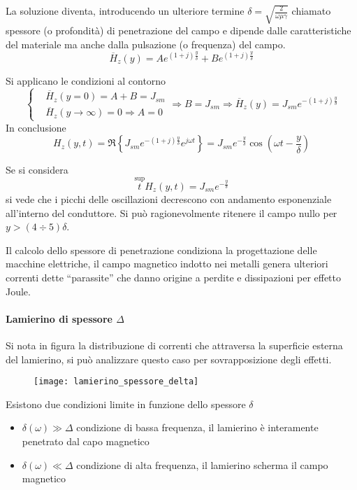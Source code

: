La soluzione diventa, introducendo un ulteriore termine $\delta = \sqrt{\frac{2}{\omega\mu\gamma}}$ chiamato 
spessore (o profondità) di penetrazione del campo e dipende dalle caratteristiche del materiale ma anche
dalla pulsazione (o frequenza) del campo.
$$
\overline{H}_z(y) = Ae^{(1+j)\frac{y}{\delta}} + Be^{(1+j)\frac{y}{\delta}}
$$

Si applicano le condizioni al contorno
$$\left\{
\begin{aligned}
&\overline{H}_z(y=0) = A + B = J_{sm}\\
&\overline{H}_z(y\to\infty)=0 \Rightarrow A = 0
\end{aligned}\right.\Rightarrow B = J_{sm} \Rightarrow \overline{H}_z(y) = J_{sm} e^{-(1+j)\frac{y}{\delta}}
$$
In conclusione
$$
H_z(y,t) = \Re \left\{J_{sm}e^{-(1+j)\frac{y}{\delta}}e^{j\omega t} \right\} = J_{sm}e^{-\frac{y}{\delta}}\cos\left(\omega t - \frac{y}{\delta}\right)
$$

Se si considera 
$$
\stackrel{\text{sup}}{t} H_z(y,t) = J_{sm} e^{-\frac{y}{\delta}}
$$
si vede che i picchi delle oscillazioni decrescono con andamento esponenziale all'interno del conduttore.
Si può ragionevolmente ritenere il campo nullo per $y> (4\div5)\delta$.

Il calcolo dello spessore di penetrazione condiziona la progettazione delle macchine elettriche,
il campo magnetico indotto nei metalli genera ulteriori correnti dette ``parassite'' che danno
origine a perdite e dissipazioni per effetto Joule.
\newpage
\paragraph{Lamierino di spessore $\Delta$}
Si nota in figura la distribuzione di correnti che attraversa la superficie esterna del lamierino,
si può analizzare questo caso per sovrapposizione degli effetti.

\begin{figure}[H]
\centering
\texttt{[image: lamierino\_spessore\_delta]}
\end{figure}

Esistono due condizioni limite in funzione dello spessore $\delta$
\begin{itemize}
\item $\delta(\omega) \gg \Delta$ condizione di bassa frequenza, il lamierino è interamente penetrato
dal capo magnetico
\item $\delta(\omega) \ll \Delta$ condizione di alta frequenza, il lamierino scherma il campo magnetico
\end{itemize}

